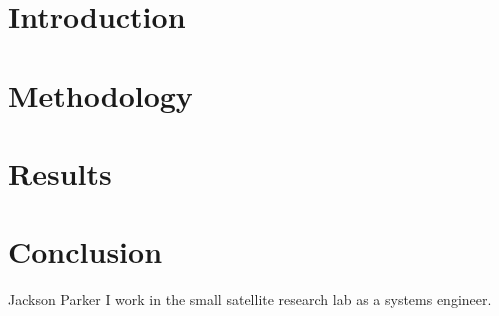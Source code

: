 \documentclass[conference]{IEEEtran}
\begin{document}
\section{Introduction}


\section{Methodology}

\section{Results}

\section{Conclusion}




\ifCLASSOPTIONcaptionsoff
  \newpage
\fi




% 



\begin{IEEEbiography}{Jackson Parker}
I work in the small satellite research lab as a systems engineer.
\end{IEEEbiography}
\end{document}

